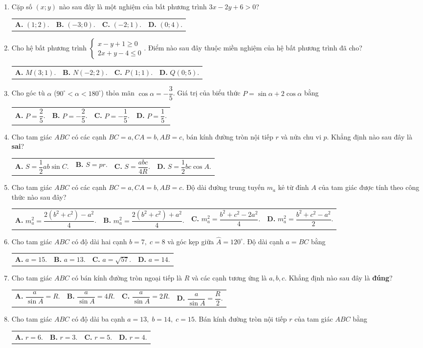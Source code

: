 \documentclass[12pt,a4paper]{article}
\makeatletter
\newcommand{\four}[4]{\par\noindent\begin{tabularx}{\linewidth}{@{}*{4}{>{\raggedright\arraybackslash}X}@{}}\textbf{A.} #1&\textbf{B.} #2&\textbf{C.} #3&\textbf{D.} #4\end{tabularx}}
\makeatother
\begin{document}
\begin{enumerate}
\item Cặp số $(x; y)$ nào sau đây là một nghiệm của bất phương trình $3x - 2y + 6 > 0$?
\four{$(1; 2)$.}{$(-3; 0)$.}{$(-2; 1)$.}{$(0; 4)$.}

\item Cho hệ bất phương trình $\begin{cases} x - y + 1 \ge 0 \\ 2x + y - 4 \le 0 \end{cases}$. Điểm nào sau đây thuộc miền nghiệm của hệ bất phương trình đã cho?
\four{$M(3; 1)$.}{$N(-2; 2)$.}{$P(1; 1)$.}{$Q(0; 5)$.}

\item Cho góc tù $\alpha$ ($90^\circ < \alpha < 180^\circ$) thỏa mãn $\cos \alpha = -\dfrac{3}{5}$. Giá trị của biểu thức $P = \sin \alpha + 2\cos \alpha$ bằng
\four{$P = \dfrac{2}{5}$.}{$P = -\dfrac{2}{5}$.}{$P = -\dfrac{1}{5}$.}{$P = \dfrac{1}{5}$.}

\item Cho tam giác $ABC$ có các cạnh $BC = a, CA = b, AB = c$, bán kính đường tròn nội tiếp $r$ và nửa chu vi $p$. Khẳng định nào sau đây là \textbf{sai}?
\four{$S = \dfrac{1}{2}ab\sin C$.}{$S = pr$.}{$S = \dfrac{abc}{4R}$.}{$S = \dfrac{1}{2}bc\cos A$.}

\pagebreak
\item Cho tam giác $ABC$ có các cạnh $BC = a, CA = b, AB = c$. Độ dài đường trung tuyến $m_a$ kẻ từ đỉnh $A$ của tam giác được tính theo công thức nào sau đây?
\four{$m_a^2 = \dfrac{2(b^2 + c^2) - a^2}{4}$.}{$m_a^2 = \dfrac{2(b^2 + c^2) + a^2}{4}$.}{$m_a^2 = \dfrac{b^2 + c^2 - 2a^2}{4}$.}{$m_a^2 = \dfrac{b^2 + c^2 - a^2}{2}$.}

\item Cho tam giác $ABC$ có độ dài hai cạnh $b = 7,\; c = 8$ và góc kẹp giữa $\widehat{A} = 120^\circ$. Độ dài cạnh $a = BC$ bằng
\four{$a = 15$.}{$a = 13$.}{$a = \sqrt{57}$.}{$a = 14$.}

\item Cho tam giác $ABC$ có bán kính đường tròn ngoại tiếp là $R$ và các cạnh tương ứng là $a, b, c$. Khẳng định nào sau đây là \textbf{đúng}?
\four{$\dfrac{a}{\sin A} = R$.}{$\dfrac{a}{\sin A} = 4R$.}{$\dfrac{a}{\sin A} = 2R$.}{$\dfrac{a}{\sin A} = \dfrac{R}{2}$.}

\item Cho tam giác $ABC$ có độ dài ba cạnh $a = 13,\; b = 14,\; c = 15$. Bán kính đường tròn nội tiếp $r$ của tam giác $ABC$ bằng
\four{$r = 6$.}{$r = 3$.}{$r = 5$.}{$r = 4$.}
\end{enumerate}
\end{document}
